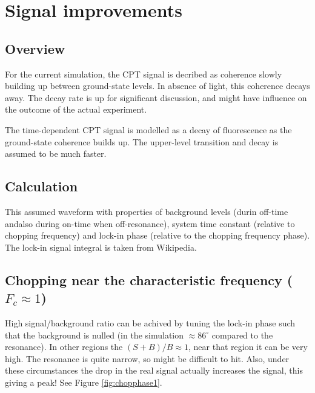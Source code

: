 \documentclass[10pt,a4paper]{article}
\begin{document}
\section{Signal improvements}

\subsection{Overview}
  For the current simulation, the CPT signal is decribed as coherence slowly building up between ground-state levels. In absence of light, this coherence decays away. The decay rate is up for significant discussion, and might have influence on the outcome of the actual experiment.

  The time-dependent CPT signal is modelled as a decay of fluorescence as the ground-state coherence builds up. The upper-level transition and decay is assumed to be much faster.

\subsection{Calculation}
  This assumed waveform with properties of background levels (durin off-time andalso during on-time when off-resonance), system time constant (relative to chopping frequency) and lock-in phase (relative to the chopping frequency phase). The lock-in signal integral is taken from Wikipedia.

\subsection{Chopping near the characteristic frequency ($F_c \approx 1$)}
  High signal/background ratio can be achived by tuning the lock-in phase such that the background is nulled (in the simulation $\approx 86^{\circ}$ compared to the resonance). In other regions the $(S + B)/B \approx 1$, near that region it can be very high. The resonance is quite narrow, so might be difficult to hit.
  Also, under these circumstances the drop in the real signal actually increases the signal, this giving a peak! See Figure \ref{fig:chopphase1}.
\end{document}
